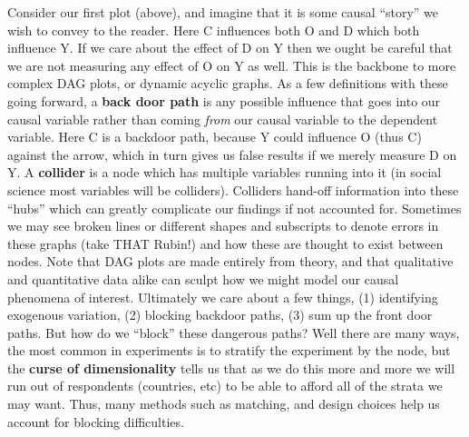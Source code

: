 \documentclass[12pt]{article}\usepackage[]{graphicx}\usepackage[]{color}
\begin{document}
\begin{flushleft}
\begin{center}
\end{center}
\hfill

Consider our first plot (above), and imagine that it is some causal ``story'' we wish to convey to the reader. Here C influences both O and D which both influence Y. If we care about the effect of D on Y then we ought be careful that we are not measuring any effect of O on Y as well. This is the backbone to more complex DAG plots, or dynamic acyclic graphs. As a few definitions with these going forward, a \textbf{back door path} is any possible influence that goes into our causal variable rather than coming \textit{from} our causal variable to the dependent variable. Here C is a backdoor path, because Y could influence O (thus C) against the arrow, which in turn gives us false results if we merely measure D on Y. A \textbf{collider} is a node which has multiple variables running into it (in social science most variables will be colliders). Colliders hand-off information into these ``hubs'' which can greatly complicate our findings if not accounted for. Sometimes we may see broken lines or different shapes and subscripts to denote errors in these graphs (take THAT Rubin!) and how these are thought to exist between nodes. Note that DAG plots are made entirely from theory, and that qualitative and quantitative data alike can sculpt how we might model our causal phenomena of interest. Ultimately we care about a few things, (1) identifying exogenous variation, (2) blocking backdoor paths, (3) sum up the front door paths. But how do we ``block'' these dangerous paths? Well there are many ways, the most common in experiments is to stratify the experiment by the node, but the \textbf{curse of dimensionality} tells us that as we do this more and more we will run out of respondents (countries, etc) to be able to afford all of the strata we may want. Thus, many methods such as matching, and design choices help us account for blocking difficulties.    


\end{flushleft}
\end{document}
